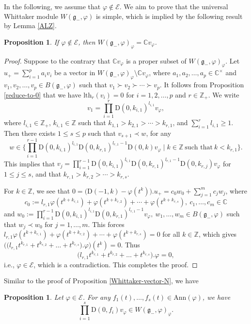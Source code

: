 \documentclass[12pt, a4paper]{amsart}
\newcommand{\fg}{\mathfrak g}
\newcommand{\C}{\mathbb{C}}
\newcommand{\Z}{\mathbb Z}
\newcommand{\rD}{\mathrm{D}}
\theoremstyle{Theorem}
\theoremstyle{Theorem}
\newtheorem{proposition}[thm]{Proposition}
\numberwithin{equation}{section}
\begin{document}
In the following, we assume that $\varphi\notin\mathcal{E}$.
We aim to prove that the universal Whittaker module $W(\fg_{-},\varphi)$ is simple, which is implied by
the following result by Lemma \ref{ALZ}.
\begin{proposition}\label{var-not-exp}
If $\varphi\notin\mathcal{E}$, then $W(\fg_{-},\varphi)_{\varphi}=\C v_{\varphi}$.
\end{proposition}
\begin{proof} Suppose to the contrary that $\C v_{\varphi}$ is a proper subset of $W(\fg_{-},\varphi)_{\varphi}$.
Let $u_{+}=\sum_{i=1}^{p}a_{i}v_{i}$ be a vector in $W(\fg_{-},\varphi)_{\varphi}\setminus\C v_{\varphi}$,
where $a_{1},a_{2},\dots,a_{p}\in\C^{\times}$ and $v_{1},v_{2},\dots,v_{p}\in B(\fg_{-},\varphi)$
such that $v_{1}\succ v_{2}\succ \cdots\succ v_{p}$.
It follows from Proposition \ref{reduce-to-0} that we have $\mathrm{lth}_{r}(v_{i})=0$ for $i=1,2,\dots,p$ and
$r\in\Z_{+}$. We write \[v_{1}=\prod_{i=1}^{r}\rD(0,k_{i,1})^{l_{i,1}}v_{\varphi},\]
where $l_{i,1}\in\Z_{+}$, $k_{i,1}\in\Z$ such that $k_{1,1}>k_{2,1}>\cdots>k_{r,1}$,
and $\sum_{i=1}^{r}l_{i,1}\geq 1$.
Then there exists $1\leq s\leq p$ such that $v_{s+1}\prec w$,
for any
\[w\in\Big\{\prod_{i=1}^{r-1}\rD(0,k_{i,1})^{l_{i,1}}\rD(0,k_{r,1})^{l_{r,1}-1}
\rD(0,k)v_{\varphi}\mid k\in\Z\ \text{such that}\ k<k_{r,1}\Big\}.\]
This implies that
$v_{j}=\prod_{i=1}^{r-1}\rD(0,k_{i,1})^{l_{i,1}}\rD(0,k_{r,1})^{l_{r,1}-1}\rD(0,k_{r,j})v_{\varphi}$
for $1\leq j\leq s$, and that $k_{r,1}>k_{r,2}>\cdots>k_{r,s}$.

For $k\in\Z$, we see that
$0=\big(\rD(-1,k)-\varphi(t^{k})\big).u_{+}=
c_{0}w_{0}+\sum_{j=1}^{m}c_{j}w_{j}$,
where \[c_{0}:=l_{r,1}\varphi(t^{k+k_{r,1}})+\varphi(t^{k+k_{r,2}})
+\cdots+\varphi(t^{k+k_{r,s}}),\ c_{1},\dots,c_{m}\in\C\]
and
$w_{0}:=\prod_{i=1}^{r-1}\rD(0,k_{i,1})^{l_{i,1}}
\rD(0,k_{r,1})^{l_{r,1}-1}v_{\varphi},\ w_{1},\dots,w_{m}\in B(\fg_{-},\varphi)$
such that $w_{j}\prec w_{0}$ for $j=1,\dots,m$. This forces
$l_{r,1}\varphi(t^{k+k_{r,1}})+\varphi(t^{k+k_{r,2}})+\cdots+\varphi(t^{k+k_{r,s}})=0$
for all $k\in\Z$, which gives
$\Big(\big(l_{r,1}t^{k_{r,1}}+t^{k_{r,2}}+\dots+t^{k_{r,s}}\big).\varphi\Big)(t^{k})=0$.
Thus \[\big(l_{r,1}t^{k_{r,1}}+t^{k_{r,2}}+\dots+t^{k_{r,s}}\big).\varphi=0,\]
i.e., $\varphi\in\mathcal{E}$, which is a contradiction. This completes the proof.
\end{proof}

Similar to the proof of Proposition \ref{Whittaker-vector-N}, we have
\begin{proposition}
Let $\varphi\in\mathcal{E}$. For any $f_{1}(t),\dots, f_{s}(t)\in\mathrm{Ann}(\varphi)$, we have
\[\prod_{i=1}^{s}\rD(0,f_{i})v_{\varphi}\in W(\fg_{-},\varphi)_{\varphi}.\]
\end{proposition}
\end{document}

